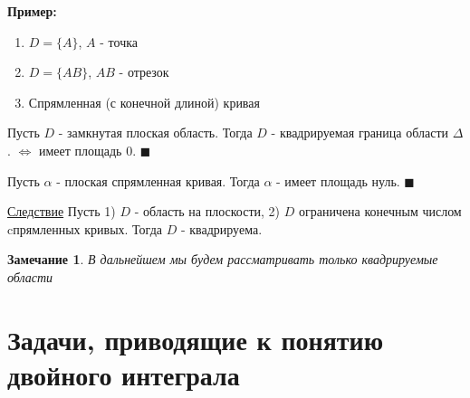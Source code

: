 \documentclass[a4paper, 14pt]{report}
\newtheorem{note}{Замечание}[chapter]
\begin{document}
\hfill

\textbf{Пример:}
\begin{enumerate}
    \item[1)] $D = \{ A \}$, $A$ - точка
    \item[2)] $D = \{ AB \}$, $AB$ - отрезок
    \item[3)] Спрямленная (с конечной длиной) кривая
\end{enumerate}

\begin{theorem}
    Пусть $D$ - замкнутая плоская область. Тогда $D$ - квадрируемая граница области $\Delta$. $\Leftrightarrow$ имеет площадь 0. $\blacksquare$
\end{theorem}

\hfill

\begin{theorem}
    Пусть $\alpha$ - плоская спрямленная кривая. Тогда $\alpha$ - имеет площадь нуль. $\blacksquare$
\end{theorem}

\hfill

\underline{Следствие} Пусть 1) $D$ - область на плоскости, 2) $D$ ограничена конечным числом cпрямленных кривых. Тогда $D$ - квадрируема.

\hfill

\begin{note}
    В дальнейшем мы будем рассматривать только квадрируемые области
\end{note}

\section{Задачи, приводящие к понятию двойного интеграла}
\end{document}
